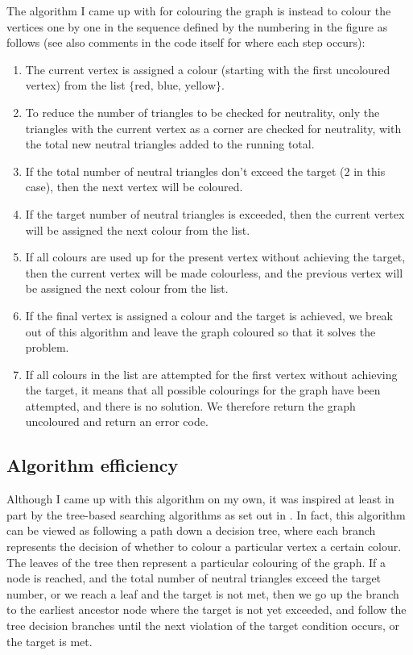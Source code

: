 \documentclass[letterpaper,10pt]{article}
\begin{document}
The algorithm I came up with for colouring the graph is instead to colour the vertices one by one in the sequence defined by the numbering in 
the figure as follows (see also comments in the code itself for where each step occurs):
\begin{enumerate}
 \item The current vertex is assigned a colour (starting with the first uncoloured vertex) from the list $\{\textrm{red},\,\textrm{blue},\,\textrm{yellow}\}$.  
 \item To reduce the number of triangles to be checked for neutrality, 
 only the triangles with the current vertex as a corner are checked for neutrality, 
 with the total new neutral triangles added to the running total.
 \item If the total number of neutral triangles don't exceed the target 
 ($2$ in this case), then the next vertex will be coloured.  
  \item If the target number of neutral triangles is exceeded, then the current vertex will be assigned the next colour from the list.
  \item If all colours are used up for the present vertex without achieving the target, then the current vertex will be made colourless,  
and the previous vertex will be assigned the next colour from the list.
  \item If the final vertex is assigned a colour and the target is achieved, we break out of this algorithm and leave the graph coloured so that it 
  solves the problem.
  \item If all colours in the list are attempted for the first vertex without achieving the target, it means that all possible colourings for the 
  graph have been attempted, and there is no solution.  We therefore return the graph uncoloured and return an error code.
\end{enumerate}
\subsection{Algorithm efficiency}
Although I came up with this algorithm on my own, it was inspired at least in part by the tree-based searching algorithms as set out in 
\cite{inspiration}.  In fact, this algorithm can be viewed as following a path down a decision tree, where each branch represents the decision of 
whether to colour a particular vertex a certain colour.  The leaves of the tree then represent a particular colouring of the graph.  
If a node is reached, and the total number of neutral triangles exceed the target number, or we reach a leaf and the target is not met, 
then we go up the branch to the earliest ancestor node where the target is not yet exceeded, and follow the tree decision branches until the next 
violation of the target condition occurs, or the target is met.
\end{document}
